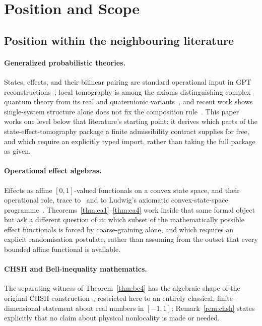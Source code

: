 \documentclass[11pt,a4paper]{article}
\begin{document}
  \section{Position and Scope}
  \label{sec:position}

  \subsection{Position within the neighbouring literature}
    \label{ssec:position}

    \paragraph{Generalized probabilistic theories.}
    States, effects, and their bilinear pairing are standard operational input in GPT
    reconstructions~\cite{Hardy2001,Barrett2007,ChiribellaDArianoPerinotti2011}; local tomography is among
    the axioms distinguishing complex quantum theory from its real and quaternionic
    variants~\cite{Barrett2007}, and recent work shows single-system structure alone does not fix the
    composition rule~\cite{ErbaPerinotti2024}.
    This paper works one level below that literature's starting point: it derives which parts of the
    state-effect-tomography package a finite admissibility contract supplies for free, and which require an
    explicitly typed import, rather than taking the full package as given.

    \paragraph{Operational effect algebras.}
    Effects as affine $[0,1]$-valued functionals on a convex state space, and their operational role, trace
    to~\cite{DaviesLewis1970} and to Ludwig's axiomatic convex-state-space
    programme~\cite{Ludwig1983}.
    Theorems~\ref{thm:ea1}--\ref{thm:ea4} work inside that same formal object but ask a different question of
    it: which subset of the mathematically possible effect functionals is forced by coarse-graining alone,
    and which requires an explicit randomisation postulate, rather than assuming from the outset that every
    bounded affine functional is available.

    \paragraph{CHSH and Bell-inequality mathematics.}
    The separating witness of Theorem~\ref{thm:bc4} has the algebraic shape of the original
    CHSH construction~\cite{ClauserHorneShimonyHolt1969}, restricted here to an entirely classical,
    finite-dimensional statement about real numbers in $[-1,1]$; Remark~\ref{rem:chsh} states explicitly that
    no claim about physical nonlocality is made or needed.
\end{document}
